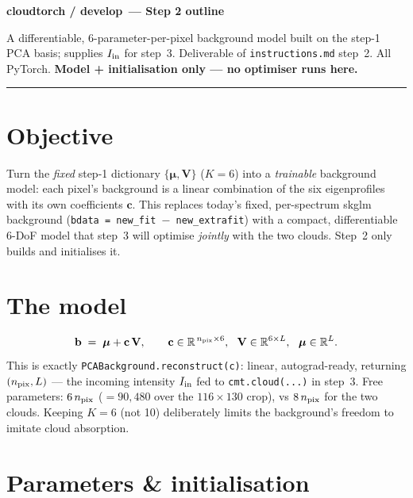 \documentclass[10pt,a4paper]{article}
\newcommand{\co}[1]{{\small\texttt{#1}}}
\begin{document}
\small

{\sffamily\bfseries\large\color{acc} cloudtorch / develop\, --- Step 2 outline}

\vspace{1pt}
{\sffamily\color{gry}\footnotesize A differentiable, 6-parameter-per-pixel background model built on the step-1 PCA basis; supplies $I_{\rm in}$ for step~3. Deliverable of \co{instructions.md} step~2. All PyTorch. \textbf{Model + initialisation only --- no optimiser runs here.}}

\vspace{1pt}
{\footnotesize\color{gry}\rule{\textwidth}{0.4pt}}

\section{Objective}

Turn the \emph{fixed} step-1 dictionary $\{\boldsymbol\mu,\mathbf V\}$ ($K=6$) into a \emph{trainable} background model: each pixel's background is a linear combination of the six eigenprofiles with its own coefficients $\mathbf c$. This replaces today's fixed, per-spectrum skglm background (\co{bdata\,=\,new\_fit\,$-$\,new\_extrafit}) with a compact, differentiable 6-DoF model that step~3 will optimise \emph{jointly} with the two clouds. Step~2 only builds and initialises it.

\section{The model}

\[
\mathbf b \;=\; \boldsymbol\mu + \mathbf c\,\mathbf V,\qquad
\mathbf c\in\mathbb R^{\,n_{\rm pix}\times 6},\ \ \mathbf V\in\mathbb R^{6\times L},\ \ \boldsymbol\mu\in\mathbb R^{L}.
\]
This is exactly \co{PCABackground.reconstruct(c)}: linear, autograd-ready, returning $(n_{\rm pix},L)$ --- the incoming intensity $I_{\rm in}$ fed to \co{cmt.cloud(...)} in step~3. Free parameters: $6\,n_{\rm pix}$ ($=90{,}480$ over the $116{\times}130$ crop), vs $8\,n_{\rm pix}$ for the two clouds. Keeping $K=6$ (not 10) deliberately limits the background's freedom to imitate cloud absorption.

\section{Parameters \& initialisation}
\end{document}
